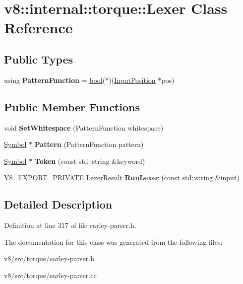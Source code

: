 \hypertarget{classv8_1_1internal_1_1torque_1_1Lexer}{}\section{v8\+:\+:internal\+:\+:torque\+:\+:Lexer Class Reference}
\label{classv8_1_1internal_1_1torque_1_1Lexer}
\subsection*{Public Types}
\begin{DoxyCompactItemize}
\item 
\mbox{\label{classv8_1_1internal_1_1torque_1_1Lexer_a02b2a852a311052b0519ab923fb9792a}} 
using {\bfseries Pattern\+Function} = \mbox{\hyperlink{classbool}{bool}}($\ast$)(\mbox{\hyperlink{classchar}{Input\+Position}} $\ast$pos)
\end{DoxyCompactItemize}
\subsection*{Public Member Functions}
\begin{DoxyCompactItemize}
\item 
\mbox{\label{classv8_1_1internal_1_1torque_1_1Lexer_a88edee0597dc3c5ff57d2a7e56cb7134}} 
void {\bfseries Set\+Whitespace} (Pattern\+Function whitespace)
\item 
\mbox{\label{classv8_1_1internal_1_1torque_1_1Lexer_a74de4c096b00818271fe9b60a3dcaf7a}} 
\mbox{\hyperlink{classv8_1_1internal_1_1torque_1_1Symbol}{Symbol}} $\ast$ {\bfseries Pattern} (Pattern\+Function pattern)
\item 
\mbox{\label{classv8_1_1internal_1_1torque_1_1Lexer_aed762ad0edf3c8ee8bca1c6156e64548}} 
\mbox{\hyperlink{classv8_1_1internal_1_1torque_1_1Symbol}{Symbol}} $\ast$ {\bfseries Token} (const std\+::string \&keyword)
\item 
\mbox{\label{classv8_1_1internal_1_1torque_1_1Lexer_abe605c57fb1ffda0ce8030b3dd6abf93}} 
V8\+\_\+\+E\+X\+P\+O\+R\+T\+\_\+\+P\+R\+I\+V\+A\+TE \mbox{\hyperlink{structv8_1_1internal_1_1torque_1_1LexerResult}{Lexer\+Result}} {\bfseries Run\+Lexer} (const std\+::string \&input)
\end{DoxyCompactItemize}


\subsection{Detailed Description}


Definition at line 317 of file earley-\/parser.\+h.



The documentation for this class was generated from the following files\+:\begin{DoxyCompactItemize}
\item 
v8/src/torque/earley-\/parser.\+h\item 
v8/src/torque/earley-\/parser.\+cc\end{DoxyCompactItemize}
